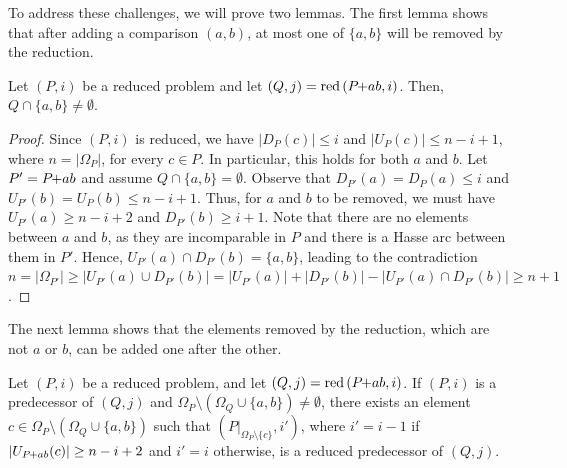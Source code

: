 \documentclass[twoside,leqno,twocolumn]{article}
\newcommand{\pchild}[3]{{#1}\kern-1pt{+}{#2}{#3}}
\newcommand{\reduced}[1]{\operatorname{red}{#1}}
\newcommand{\less}[2]{D_{#1}(#2)}
\newcommand{\greater}[2]{U_{#1}(#2)}
\begin{document}
To address these challenges, we will prove two lemmas.
The first lemma shows that after adding a comparison $(a, b)$, at most one of $\{a, b\}$ will be removed by the reduction.

\begin{lemma} \label{lemma:remove_only_last_element_edge}
  Let $(P, i)$ be a reduced problem and let $(Q, j) = \reduced{(\pchild{P}{a}{b}, i)}$.
  Then, $Q \cap \{a, b\} \neq \emptyset$.
\end{lemma}

\begin{proof}
  Since $(P, i)$ is reduced, we have $|\less{P}{c}| \leq i$ and $|\greater{P}{c}| \leq n - i + 1$, where $n = |\Omega_P|$, for every $c \in P$.
  In particular, this holds for both $a$ and $b$.
  Let $P' = \pchild{P}{a}{b}$ and assume $Q \cap \{a, b\} = \emptyset$.
  Observe that $\less{P'}{a} = \less{P}{a} \leq i$ and $\greater{P'}{b} = \greater{P}{b} \leq n - i + 1$.
  Thus, for $a$ and $b$ to be removed, we must have $\greater{P'}{a} \geq n - i + 2$ and $\less{P'}{b} \geq i + 1$.
  Note that there are no elements between $a$ and $b$, as they are incomparable in $P$ and there is a Hasse arc between them in $P'$.
  Hence, $\greater{P'}{a} \cap \less{P'}{b} = \{a, b\}$, leading to the contradiction $n = |\Omega_{P'}| \ge |\greater{P'}{a} \cup \less{P'}{b}| = |\greater{P'}{a}| + |\less{P'}{b}| - |\greater{P'}{a} \cap \less{P'}{b}| \ge n + 1$.
\end{proof}

The next lemma shows that the elements removed by the reduction, which are not $a$ or $b$, can be added one after the other.

\begin{lemma} \label{lemma:remove_elements_iteratively}
  Let $(P, i)$ be a reduced problem, and let $(Q, j) = \reduced{(\pchild{P}{a}{b}, i)}$.
  If $(P, i)$ is a predecessor of $(Q, j)$ and $\Omega_P \setminus (\Omega_Q \cup \{a, b\}) \neq \emptyset$, there exists an element $c \in \Omega_P \setminus (\Omega_Q \cup \{a, b\})$ such that $(P|_{\Omega_P \setminus \{c\}}, i')$, where $i' = i - 1$ if $|\greater{\pchild{P}{a}{b}}{c}| \ge n - i + 2$ and $i' = i$ otherwise, is a reduced predecessor of $(Q, j)$.
\end{lemma}
\end{document}
